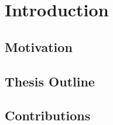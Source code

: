 \chapter{Introduction}
\label{cha:intro}


\section{Motivation}
\label{sec:motivation}


\section{Thesis Outline}
\label{sec:outline}


\section{Contributions}
\label{sec:contributions}
